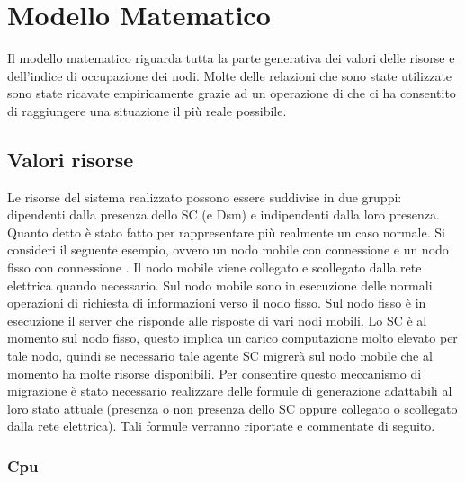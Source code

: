 \chapter{Modello Matematico}\label{cap:modello}
Il modello matematico riguarda tutta la parte generativa dei valori delle risorse e dell'indice di occupazione dei nodi. Molte delle relazioni che sono state utilizzate sono state ricavate empiricamente grazie ad un operazione di  che ci ha consentito di raggiungere una situazione il più reale possibile.
\section{Valori risorse}
Le risorse del sistema realizzato possono essere suddivise in due gruppi: dipendenti dalla presenza dello SC (e Dsm) e indipendenti dalla loro presenza. Quanto detto è stato fatto per rappresentare più realmente un caso normale. Si consideri il seguente esempio, ovvero un nodo mobile con connessione  e un nodo fisso con connessione . Il nodo mobile viene collegato e scollegato dalla rete elettrica quando necessario. Sul nodo mobile sono in esecuzione delle normali operazioni di richiesta di informazioni verso il nodo fisso. Sul nodo fisso è in esecuzione il server che risponde alle risposte di vari nodi mobili. Lo SC è al momento sul nodo fisso, questo implica un carico computazione molto elevato per tale nodo, quindi se necessario tale agente SC migrerà sul nodo mobile che al momento ha molte risorse disponibili. Per consentire questo meccanismo di migrazione è stato necessario realizzare delle formule di generazione adattabili al loro stato attuale (presenza o non presenza dello SC oppure collegato o scollegato dalla rete elettrica). Tali formule verranno riportate e commentate di seguito.
\subsection{Cpu}
